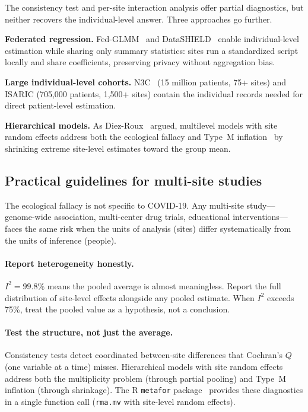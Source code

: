 \documentclass[11pt]{article}
\begin{document}
The consistency test and per-site interaction analysis offer partial
diagnostics, but neither recovers the individual-level answer.  Three
approaches go further.

\textbf{Federated regression.}
Fed-GLMM~\cite{chen2023fedglmm} and
DataSHIELD~\cite{wilson2022datashield} enable individual-level estimation
while sharing only summary statistics: sites run a standardized script
locally and share coefficients, preserving privacy without aggregation
bias.

\textbf{Large individual-level cohorts.}  N3C~\cite{haendel2021n3c}
(15 million patients, 75+ sites) and ISARIC (705,000 patients, 1,500+
sites) contain the individual records needed for direct patient-level
estimation.

\textbf{Hierarchical models.}  As
Diez-Roux~\cite{diezroux2000multilevel} argued, multilevel models with
site random effects address both the ecological fallacy and Type~M
inflation~\cite{gelman2012multilevel} by shrinking extreme site-level
estimates toward the group mean.

\subsection{Practical guidelines for multi-site studies}

The ecological fallacy is not specific to COVID-19.  Any multi-site
study---genome-wide association, multi-center drug trials, educational
interventions---faces the same risk when the units of analysis (sites)
differ systematically from the units of inference (people).

\paragraph{Report heterogeneity honestly.}
$I^2 = 99.8\%$ means the pooled average is almost meaningless.
Report the full distribution of site-level effects alongside any
pooled estimate.  When $I^2$ exceeds 75\%, treat the pooled value as a
hypothesis, not a conclusion.

\paragraph{Test the structure, not just the average.}
Consistency tests detect coordinated between-site differences that
Cochran's $Q$ (one variable at a time) misses.  Hierarchical models
with site random effects address both the multiplicity problem (through
partial pooling) and Type~M inflation (through shrinkage).  The R
\texttt{metafor} package~\cite{viechtbauer2010metafor} provides these
diagnostics in a single function call (\texttt{rma.mv} with site-level
random effects).
\end{document}
